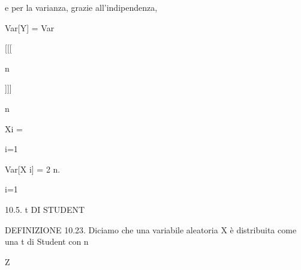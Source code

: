\documentclass[a4paper,portrait,12pt]{article}
\begin{document}
\begin{flushleft}
e per la varianza, grazie all'indipendenza,
\end{flushleft}


\begin{flushleft}
Var[Y] = Var
\end{flushleft}





[[[





\begin{flushleft}
n
\end{flushleft}





]]]





\begin{flushleft}
n
\end{flushleft}





\begin{flushleft}
Xi =
\end{flushleft}


\begin{flushleft}
i=1
\end{flushleft}





\begin{flushleft}
Var[X i] = 2 n.
\end{flushleft}


\begin{flushleft}
i=1
\end{flushleft}





\begin{flushleft}
10.5. t DI STUDENT
\end{flushleft}


\begin{flushleft}
DEFINIZIONE 10.23. Diciamo che una variabile aleatoria X \`{e} distribuita come una t di Student con n
\end{flushleft}


\begin{flushleft}
Z
\end{flushleft}
\end{document}
